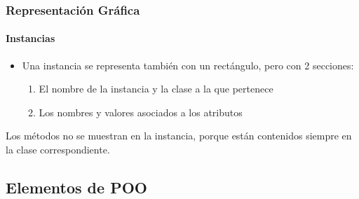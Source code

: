 \documentclass{beamer}
\begin{document}
\begin{frame}
  \frametitle{Representación Gráfica}
  \framesubtitle{Instancias}

  \begin{itemize}
  \item Una instancia se representa también con un rectángulo, pero
    con 2 secciones:
    \begin{enumerate}
    \item El nombre de la instancia y la clase a la que pertenece
    \item Los nombres y valores asociados a los atributos  
    \end{enumerate}
  \end{itemize}    

    Los métodos no se muestran en la instancia, porque están
    contenidos siempre en la clase correspondiente.

  \end{frame}


  \subsection{Elementos de POO}
\end{document}
